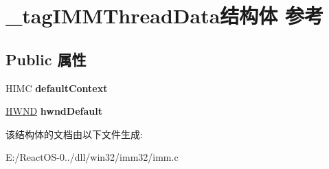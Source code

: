 \hypertarget{struct__tag_i_m_m_thread_data}{}\section{\+\_\+tag\+I\+M\+M\+Thread\+Data结构体 参考}
\label{struct__tag_i_m_m_thread_data}
\subsection*{Public 属性}
\begin{DoxyCompactItemize}
\item 
\mbox{\label{struct__tag_i_m_m_thread_data_a9e0c8571080c451324bb132cb0bee179}} 
H\+I\+MC {\bfseries default\+Context}
\item 
\mbox{\label{struct__tag_i_m_m_thread_data_af71def1fdb049c0959efb37a9c1cbbfb}} 
\hyperlink{interfacevoid}{H\+W\+ND} {\bfseries hwnd\+Default}
\end{DoxyCompactItemize}


该结构体的文档由以下文件生成\+:\begin{DoxyCompactItemize}
\item 
E\+:/\+React\+O\+S-\/0../dll/win32/imm32/imm.\+c\end{DoxyCompactItemize}
